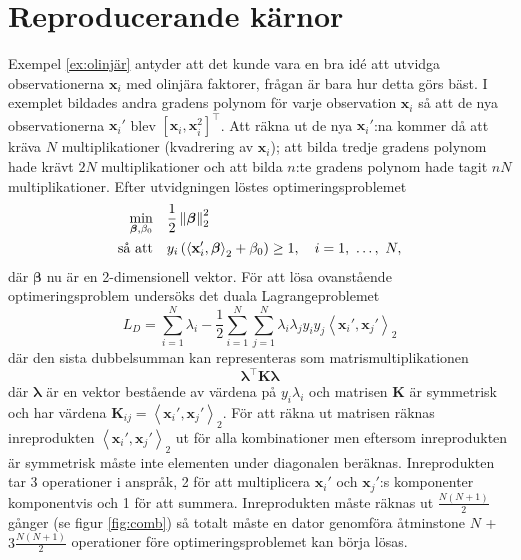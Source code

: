\documentclass[a4paper, 12pt]{report}
\theoremstyle{definition}
\theoremstyle{remark}
\newcommand{\bfbeta}{{\boldsymbol{\beta}}}
\newcommand{\bfx}{\mathbf{x}}
\newcommand{\llangle}{\left\langle}
\newcommand{\rrangle}{\right\rangle}
\newcommand{\inner}[2]{\llangle #1, #2 \rrangle}
\begin{document}
\chapter{Reproducerande kärnor}
Exempel \ref{ex:olinjär} antyder att det kunde vara en bra idé att utvidga observationerna $\mathbf{x}_i$ med olinjära faktorer, frågan är bara hur detta görs bäst. I exemplet bildades andra gradens polynom för varje observation $\bfx_i$ så att de nya observationerna $\bfx_i'$ blev $\left[\bfx_i, \bfx_i^2\right]^\intercal$. Att räkna ut de nya $\bfx_i'$:na kommer då att kräva $N$ multiplikationer (kvadrering av $\bfx_i$); att bilda tredje gradens polynom hade krävt $2N$ multiplikationer och att bilda $n$:te gradens polynom hade tagit $nN$ multiplikationer. Efter utvidgningen löstes optimeringsproblemet 
\begin{equation*}
\begin{aligned}
\operatornamewithlimits{min}_{\bfbeta, \beta_0} & & &\frac{1}{2}\left\|\bfbeta
\right\|_2^2\\
\text{så att} & & &y_i\left(\inner{\bfx_i'}{\bfbeta}_2+\beta_0\right)\geq 1,\quad i=1,~\dots,~N,
\end{aligned}
\end{equation*}
där $\bfbeta$ nu är en 2-dimensionell vektor. För att lösa ovanstående optimeringsproblem undersöks det duala Lagrangeproblemet
\begin{equation*}
		L_D= \sum_{i=1}^{N}\lambda_i - \frac{1}{2}\sum_{i=1}^{N}\sum_{j=1}^{N}\lambda_i\lambda_jy_iy_j\inner{\bfx_i'}{\bfx_j'}_2
\end{equation*}
där den sista dubbelsumman kan representeras som matrismultiplikationen
\begin{equation*}
	\boldsymbol{\lambda}^\intercal\mathbf{K}\boldsymbol{\lambda}
\end{equation*}
där $\boldsymbol{\lambda}$ är en vektor bestående av värdena på $y_i\lambda_i$ och matrisen $\mathbf{K}$ är symmetrisk och har värdena $\mathbf{K}_{ij}=\inner{\bfx_i'}{\bfx_j'}_2$. För att räkna ut matrisen räknas inreprodukten $\inner{\bfx_i'}{\bfx_j'}_2$ ut för alla kombinationer men eftersom inreprodukten är symmetrisk måste inte elementen under diagonalen beräknas. Inreprodukten tar 3 operationer i anspråk, 2 för att multiplicera $\bfx_i'$ och $\bfx_j'$:s komponenter komponentvis och 1 för att summera. Inreprodukten måste räknas ut $\frac{N(N+1)}{2}$ gånger (se figur \ref{fig:comb}) så totalt måste en dator genomföra åtminstone $N$ + $3\frac{N(N+1)}{2}$ operationer före optimeringsproblemet kan börja lösas.
\end{document}
